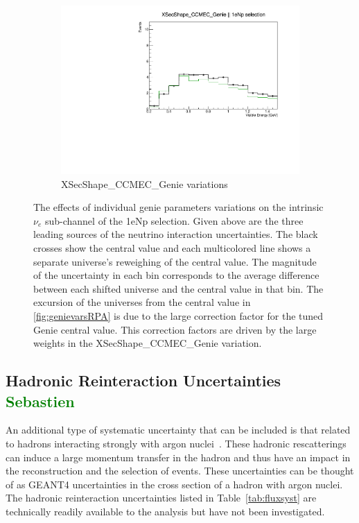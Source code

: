 \documentclass[a4paper]{article}
\begin{document}
\begin{figure}[ht]
\begin{center}
    \begin{subfigure}[b]{0.33\textwidth}
    \centering
    \includegraphics[width=1.00\textwidth]{systvariations/Variation_nue_reco_e_genietune_run1_genieonly_XSecShape_CCMEC_Genie_nu_uBooNE_nue_intrinsic.pdf}
    \caption{\label{fig:genievarsCCMEC} XSecShape\_CCMEC\_Genie variations}
    \end{subfigure}
\caption{\label{fig:geniesystvars} The effects of individual genie parameters variations on the intrinsic $\nu_e$ sub-channel of the 1eNp selection. Given above are the three leading sources of the neutrino interaction uncertainties. The black crosses show the central value and each multicolored line shows a separate universe's reweighing of the central value. The magnitude of the  uncertainty in each bin corresponds to the average difference between each shifted universe and the central value in that bin. The excursion of the universes from the central value in \ref{fig:genievarsRPA} is due to the large correction factor for the tuned Genie central value. This correction factors are driven by the large weights in the XSecShape\_CCMEC\_Genie variation.}
\end{center}
\end{figure}

\subsection{Hadronic Reinteraction Uncertainties \textcolor{green}{Sebastien}}
An additional type of systematic uncertainty that can be included is that related to hadrons interacting strongly with argon nuclei~\cite{bib:reintslides}. These hadronic rescatterings can induce a large momentum transfer in the hadron and thus have an impact in the reconstruction and the selection of events. These uncertainties can be thought of as GEANT4 uncertainties in the cross section of a hadron with argon nuclei. The hadronic reinteraction uncertainties listed in Table~\ref{tab:fluxsyst} are technically readily available to the analysis but have not been investigated.
\end{document}
